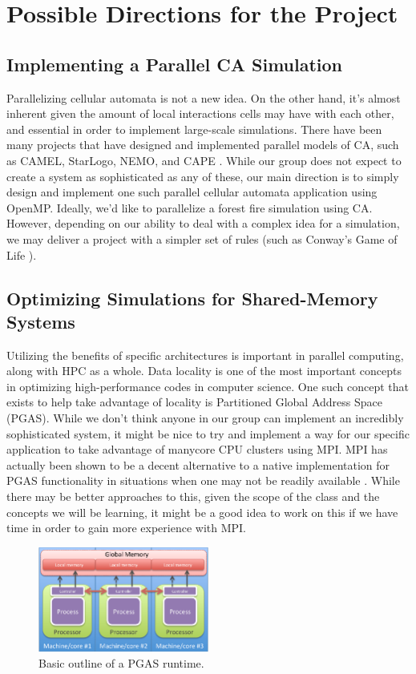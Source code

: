 \documentclass[12pt]{article}
\begin{document}
\par
\section{Possible Directions for the Project}
\subsection{Implementing a Parallel CA Simulation}
Parallelizing cellular automata is not a  new idea. On the other hand, it's almost inherent given the amount of local interactions cells may have with each other, and essential in order to implement large-scale simulations. There have been many projects that have designed and implemented parallel models of CA, such as CAMEL, StarLogo, NEMO, and CAPE \cite{Talia2007CellularA}. While our group does not expect to create a system as sophisticated as any of these, our main direction is to simply design and implement one such parallel cellular automata application using OpenMP. Ideally, we'd like to parallelize a forest fire simulation using CA. However, depending on our ability to deal with a complex idea for a simulation, we may deliver a project with a simpler set of rules (such as Conway's Game of Life \cite{Adamatzky2010GameOL}).

\par
\subsection{Optimizing Simulations for Shared-Memory Systems}
Utilizing the benefits of specific architectures is important in parallel computing, along with HPC as a whole. Data locality is one of the most important concepts in optimizing high-performance codes in computer science. One such concept that exists to help take advantage of locality is Partitioned Global Address Space (PGAS). While we don't think anyone in our group can implement an incredibly sophisticated system, it might be nice to try and implement a way for our specific application to take advantage of manycore CPU clusters using MPI. MPI has actually been shown to be a decent alternative to a native implementation for PGAS functionality in situations when one may not be readily available \cite{Daily2014OnTS}. While there may be better approaches to this, given the scope of the class and the concepts we will be learning, it might be a good idea to work on this if we have time in order to gain more experience with MPI.

\begin{figure}[h]
\centering
\includegraphics[width=0.5\textwidth]{pgas.png}
\caption{\label{fig:PGAS}Basic outline of a PGAS runtime.}
\end{figure}
\end{document}
